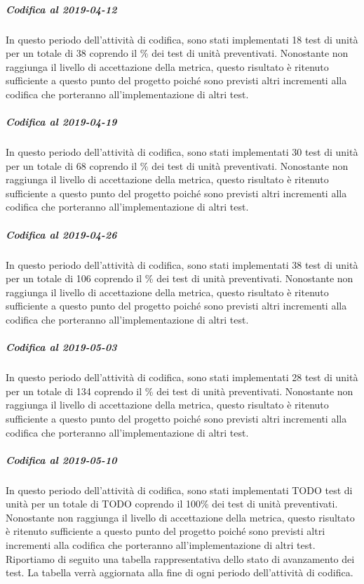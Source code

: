 \subparagraph{Codifica al 2019-04-12}
In questo periodo dell'attività di codifica, sono stati implementati 18 test di unità per un totale di 38 coprendo il \% dei test di unità preventivati.
Nonostante non raggiunga il livello di accettazione della
metrica, questo risultato è ritenuto sufficiente a questo punto del progetto poiché sono previsti altri incrementi alla codifica che porteranno all'implementazione di altri test.

\subparagraph{Codifica al 2019-04-19}
In questo periodo dell'attività di codifica, sono stati implementati 30 test di unità per un totale di 68 coprendo il \% dei test di unità preventivati.
Nonostante non raggiunga il livello di accettazione della
metrica, questo risultato è ritenuto sufficiente a questo punto del progetto poiché sono previsti altri incrementi alla codifica che porteranno all'implementazione di altri test.

\subparagraph{Codifica al 2019-04-26}
In questo periodo dell'attività di codifica, sono stati implementati 38 test di unità per un totale di 106 coprendo il \% dei test di unità preventivati.
Nonostante non raggiunga il livello di accettazione della
metrica, questo risultato è ritenuto sufficiente a questo punto del progetto poiché sono previsti altri incrementi alla codifica che porteranno all'implementazione di altri test.

\subparagraph{Codifica al 2019-05-03}
In questo periodo dell'attività di codifica, sono stati implementati 28 test di unità per un totale di 134 coprendo il \% dei test di unità preventivati.
Nonostante non raggiunga il livello di accettazione della
metrica, questo risultato è ritenuto sufficiente a questo punto del progetto poiché sono previsti altri incrementi alla codifica che porteranno all'implementazione di altri test.

\subparagraph{Codifica al 2019-05-10}
In questo periodo dell'attività di codifica, sono stati implementati TODO test di unità per un totale di TODO coprendo il 100\% dei test di unità preventivati.
Nonostante non raggiunga il livello di accettazione della
metrica, questo risultato è ritenuto sufficiente a questo punto del progetto poiché sono previsti altri incrementi alla codifica che porteranno all'implementazione di altri test.
\\Riportiamo di seguito una tabella rappresentativa dello stato di avanzamento dei test. La tabella verrà aggiornata alla fine di ogni periodo dell'attività di codifica.

